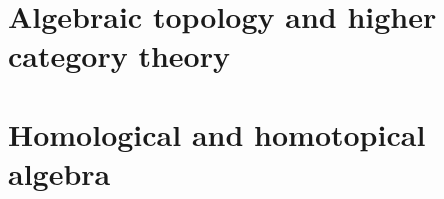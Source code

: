     \begin{appendices}
        \chapter{Algebraic topology and higher category theory}
            \begin{abstract}
                
            \end{abstract}
            
            \minitoc
            
            
            
        \chapter{Homological and homotopical algebra}
            \begin{abstract}
                
            \end{abstract}
            
            \minitoc
            
            

    \end{appendices}
	
	\printbibliography

